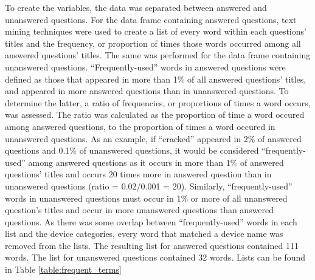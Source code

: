 \documentclass{article}
\begin{document}
To create the variables, the data was separated between answered and unanswered questions. For the data frame containing answered questions, text mining techniques were used to create a list of every word within each questions' titles and the frequency, or proportion of times those words occurred among all answered questions' titles. The same was performed for the data frame containing unanswered questions. ``Frequently-used'' words in answered questions were defined as those that appeared in more than 1\% of all answered questions' titles, and appeared in more answered questions than in unanswered questions. To determine the latter, a ratio of frequencies, or proportions of times a word occurs, was assessed. The ratio was calculated as the proportion of time a word occured among answered questions, to the proportion of times a word occured in unanswered questions. As an example, if ``cracked'' appeared in 2\% of answered questions and 0.1\% of unanswered questions, it would be considered ``frequently-used'' among answered questions as it occurs in more than 1\% of answered questions' titles and occurs 20 times more in answered question than in unanswered questions (ratio = 0.02/0.001 = 20). Similarly, ``frequently-used'' words in unanswered questions must occur in 1\% or more of all unanswered question's titles and occur in more unanswered questions than answered questions. As there was some overlap between ``frequently-used'' words in each list and the device categories, every word that matched a device name was removed from the lists. The resulting list for answered questions contained 111 words. The list for unanswered questions contained 32 words. Lists can be found in Table \ref{table:frequent_terms}
\end{document}

